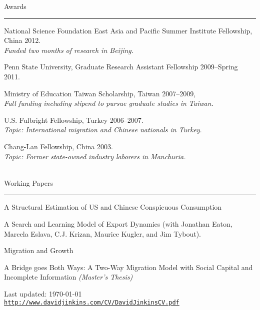 \documentclass[letterpaper]{article}
\def\footerlink{http://www.davidjinkins.com/CV/DavidJinkinsCV.pdf}
\renewenvironment{itemize}{
    \begin{list}{}{
            \setlength{\leftmargin}{1.5em}
        }
    }{
    \end{list}
}
\begin{document}
\vspace{4mm}
{\Large Awards}
\vspace{1mm}
\hrule

\begin{itemize}
    \item National Science Foundation East Asia and Pacific Summer Institute Fellowship, China 2012.
        \\
        \hspace*{1cm}\emph{Funded two months of research in Beijing.}
    \item Penn State University, Graduate Research Assistant Fellowship 2009--Spring 2011.
    \item Ministry of Education Taiwan Scholarship, Taiwan 2007--2009,\\
        \hspace*{1cm}\emph{Full funding including stipend to pursue graduate studies in Taiwan.}
    \item U.S. Fulbright Fellowship, Turkey 2006--2007.\\
        \hspace*{1cm}\emph{Topic: International migration and Chinese nationals in Turkey}.
    \item Chang-Lan Fellowship, China 2003.\\
        \hspace*{1cm}\emph{Topic: Former state-owned industry laborers in Manchuria.} \\ \\
\end{itemize}

\vspace{4mm}
{\Large Working Papers}
\vspace{1mm}
\hrule
\begin{itemize}
    \item A Structural Estimation of US and Chinese Conspicuous Consumption
    \item A Search and Learning Model of Export Dynamics (with Jonathan Eaton, Marcela Eslava, C.J. Krizan, Maurice Kugler, and Jim Tybout).
    \item Migration and Growth
    \item A Bridge goes Both Ways: A Two-Way Migration Model with Social Capital and Incomplete Information \emph{(Master's Thesis)}
\end{itemize}

\bigskip

\begin{center}
    \begin{footnotesize}
        Last updated: \today \\
        \href{\footerlink}{\texttt{\footerlink}}
    \end{footnotesize}
\end{center}
\end{document}
